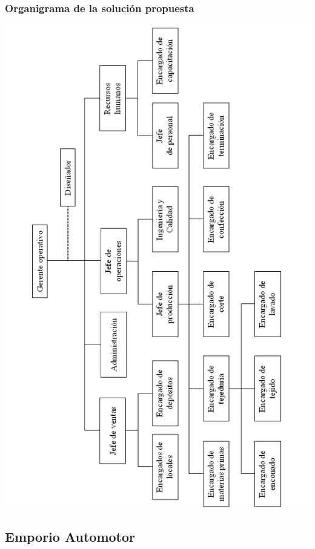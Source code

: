 \documentclass[a4paper,10pt,titlepage]{article}
\begin{document}
\subsubsection{Organigrama de la soluci\'on propuesta}
	\begin{center}
	\includegraphics[width=415pt]{./DollyOrnigramaSolucion.png}
	\end{center}


\newpage
\subsection{Emporio Automotor}
\vspace{0.5cm}
\end{document}
